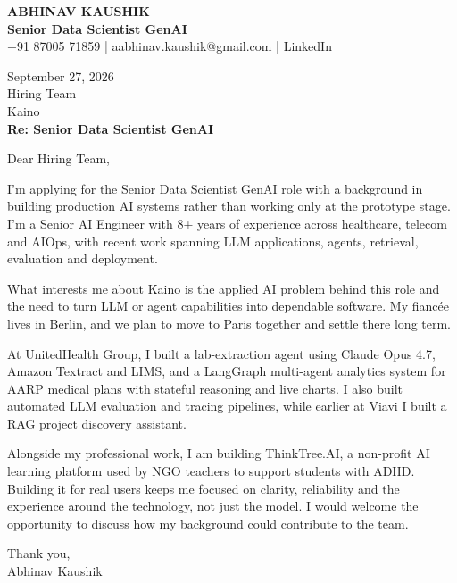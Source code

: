 \documentclass[10pt,a4paper]{article}
\begin{document}
\begin{center}
{\Large\bfseries ABHINAV KAUSHIK}\\[2pt]
{\bfseries Senior Data Scientist GenAI}\\[2pt]
+91 87005 71859 \quad | \quad aabhinav.kaushik@gmail.com \quad | \quad LinkedIn
\end{center}
\vspace{8pt}
September 27, 2026\\[6pt]
Hiring Team\\
Kaino\\[4pt]
\textbf{Re: Senior Data Scientist GenAI}

Dear Hiring Team,

I’m applying for the Senior Data Scientist GenAI role with a background in building production AI systems rather than working only at the prototype stage. I’m a Senior AI Engineer with 8+ years of experience across healthcare, telecom and AIOps, with recent work spanning LLM applications, agents, retrieval, evaluation and deployment.

What interests me about Kaino is the applied AI problem behind this role and the need to turn LLM or agent capabilities into dependable software. My fiancée lives in Berlin, and we plan to move to Paris together and settle there long term.

At UnitedHealth Group, I built a lab-extraction agent using Claude Opus 4.7, Amazon Textract and LIMS, and a LangGraph multi-agent analytics system for AARP medical plans with stateful reasoning and live charts. I also built automated LLM evaluation and tracing pipelines, while earlier at Viavi I built a RAG project discovery assistant.

Alongside my professional work, I am building ThinkTree.AI, a non-profit AI learning platform used by NGO teachers to support students with ADHD. Building it for real users keeps me focused on clarity, reliability and the experience around the technology, not just the model. I would welcome the opportunity to discuss how my background could contribute to the team.

Thank you,\\
Abhinav Kaushik
\end{document}
